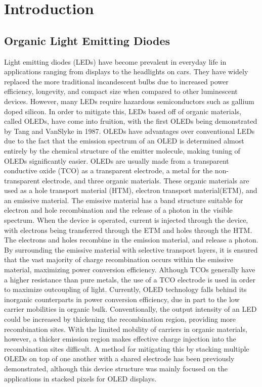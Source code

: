 \documentclass{report}
\begin{document}
\tableofcontents

\chapter{Introduction} \label{intro}

    \section{Organic Light Emitting Diodes}
        Light emitting diodes (LEDs) have become prevalent in everyday life in applications ranging from displays to the headlights on cars. They have widely replaced the more traditional incandescent bulbs due to increased power efficiency, longevity, and compact size when compared to other luminescent devices. However, many LEDs require hazardous semiconductors such as gallium doped silicon.\cite{Lim2011} In order to mitigate this, LEDs based off of organic materials, called OLEDs, have come into fruition, with the first OLEDs being demonstrated by Tang and VanSlyke in 1987.\cite{Tang1987} OLEDs have advantages over conventional LEDs due to the fact that the emission spectrum of an OLED is determined almost entirely by the chemical structure of the emitter molecule, making tuning of OLEDs significantly easier. OLEDs are usually made from a transparent conductive oxide (TCO) as a transparent electrode, a metal for the non-transparent electrode, and three organic materials. These organic materials are used as a hole transport material (HTM), electron transport material(ETM), and an emissive material.\cite{Shinar2008} The emissive material has a band structure suitable for electron and hole recombination and the release of a photon in the visible spectrum. When the device is operated, current is injected through the device, with electrons being transferred through the ETM and holes through the HTM. The electrons and holes recombine in the emission material, and release a photon. By surrounding the emissive material with selective transport layers, it is ensured that the vast majority of charge recombination occurs within the emissive material, maximizing power conversion efficiency. Although TCOs generally have a higher resistance than pure metals, the use of a TCO electrode is used in order to maximize outcoupling of light. Currently, OLED technology falls behind its inorganic counterparts in power conversion efficiency, due in part to the low carrier mobilities in organic bulk.\cite{Shinar2008} Conventionally, the output intensity of an LED could be increased by thickening the recombination region, providing more recombination sites. With the limited mobility of carriers in organic materials, however, a thicker emission region makes effective charge injection into the recombination sites difficult. A method for mitigating this by stacking multiple OLEDs on top of one another with a shared electrode has been previously demonstrated\cite{Gu1999}, although this device structure was mainly focused on the applications in stacked pixels for OLED displays.
        
\end{document}
